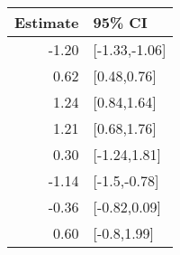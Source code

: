 \begin{tabular}{rl}
  \hline
Estimate & 95\% CI \\ 
  \hline
-1.20 & [-1.33,-1.06] \\ 
  0.62 & [0.48,0.76] \\ 
  1.24 & [0.84,1.64] \\ 
  1.21 & [0.68,1.76] \\ 
  0.30 & [-1.24,1.81] \\ 
  -1.14 & [-1.5,-0.78] \\ 
  -0.36 & [-0.82,0.09] \\ 
  0.60 & [-0.8,1.99] \\ 
   \hline
\end{tabular}

